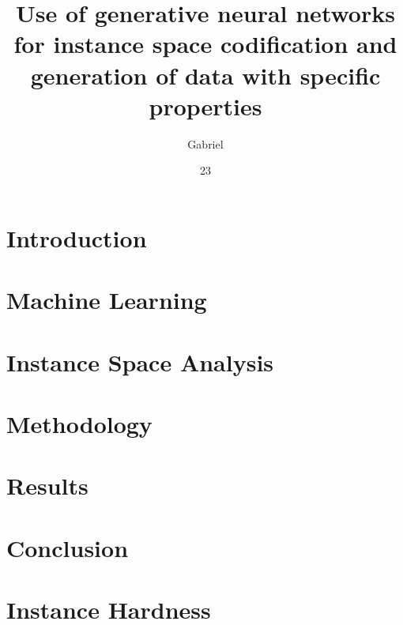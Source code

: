 \documentclass[tg, eng]{ita}    %
\author{Gabriel}{Barbosa Martinz}
\title{Use of generative neural networks for instance space codification and generation of data with specific properties}
\date{23}{June}{2023}
\begin{document}


\mainmatter

\chapter{Introduction}


\chapter{Machine Learning}


\chapter{Instance Space Analysis}


\chapter{Methodology}


\chapter{Results}


\chapter{Conclusion}


\renewcommand\bibname{\itareferencesnamebabel} %


\appendix
\chapter{Instance Hardness} \label{ch:instance_hardness} %


%

\end{document}
